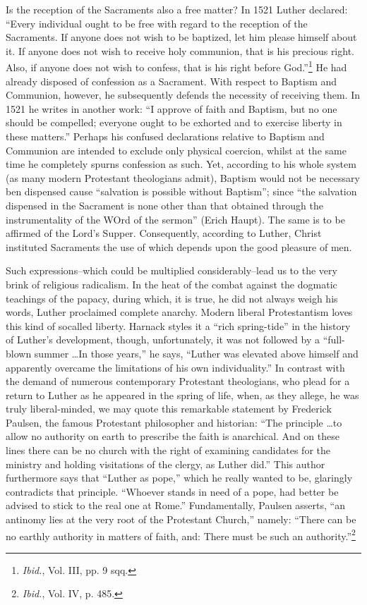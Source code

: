 Is the reception of the Sacraments also a free matter? In 1521 Luther
declared: “Every individual ought to be free with regard to the reception
of the Sacraments. If anyone does not wish to be baptized, let him please
himself about it. If anyone does not wish to receive holy communion, that
is his precious right. Also, if anyone does not wish to confess, that is his
right before God.”\footnote{\textit{Ibid.}, Vol. III, pp. 9 sqq.}
He had already disposed of confession as a Sacrament.
With respect to Baptism and Communion, however, he subsequently defends
the necessity of receiving them. In 1521 he writes in another work: “I
approve of faith and Baptism, but no one should be compelled; everyone
ought to be exhorted and to exercise liberty in these matters.” Perhaps
his confused declarations relative to Baptism and Communion are intended
to exclude only physical coercion, whilst at the same time he completely
spurns confession as such. Yet, according to his whole system (as many
modern Protestant theologians admit), Baptism would not be necessary ben
dispensed cause “salvation is possible without Baptism”; since ``the salvation dispensed
in the Sacrament is none other than that obtained through the instrumentality
of the WOrd of the sermon'' (Erich Haupt). The same is to be affirmed
of the Lord’s Supper. Consequently, according to Luther, Christ instituted
Sacraments the use of which depends upon the good pleasure of men.

Such expressions--which could be multiplied considerably--lead
us to the very brink of religious radicalism. In the heat of the combat
against the dogmatic teachings of the papacy, during which, it
is true, he did not always weigh his words, Luther proclaimed complete
anarchy. Modern liberal Protestantism loves this kind of socalled
liberty. Harnack styles it a ``rich spring-tide'' in the history
of Luther's development, though, unfortunately, it was not followed
by a ``full-blown summer \dots In those years,'' he says,
“Luther was elevated above himself and apparently overcame the
limitations of his own individuality.” In contrast with the demand
of numerous contemporary Protestant theologians, who plead for
a return to Luther as he appeared in the spring of life, when, as
they allege, he was truly liberal-minded, we may quote this remarkable
statement by Frederick Paulsen, the famous Protestant
philosopher and historian: “The principle \dots to allow no authority
on earth to prescribe the faith is anarchical. And on these lines
there can be no church with the right of examining candidates for
the ministry and holding visitations of the clergy, as Luther did.”
This author furthermore says that “Luther as pope,” which he
really wanted to be, glaringly contradicts that principle. “Whoever
stands in need of a pope, had better be advised to stick to the real
one at Rome.” Fundamentally, Paulsen asserts, “an antinomy lies at
the very root of the Protestant Church,” namely: “There can be
no earthly authority in matters of faith, and: There must be such
an authority.”\footnote{\textit{Ibid.}, Vol. IV, p. 485.}

